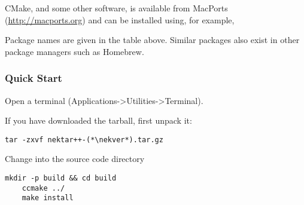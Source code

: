\begin{tipbox}
CMake, and some other software, is available from MacPorts
(\url{http://macports.org}) and can be installed using, for example,

\noindent\usebox\installationOSXMacPortsTip

Package names are given in the table above. Similar packages also exist in other
package managers such as Homebrew.
\end{tipbox}


\subsubsection{Quick Start}
Open a terminal (Applications->Utilities->Terminal).

If you have downloaded the tarball, first unpack it:
\begin{lstlisting}[style=BashInputStyle]
tar -zxvf nektar++-(*\nekver*).tar.gz
\end{lstlisting}
Change into the  source code directory
\begin{lstlisting}[style=BashInputStyle]
    mkdir -p build && cd build 
    ccmake ../
    make install
\end{lstlisting}


